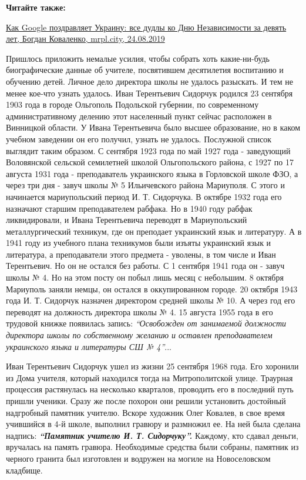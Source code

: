 \textbf{Читайте также:} 

\href{https://mrpl.city/news/view/kak-google-pozdravlyaet-ukrainu-vse-dudly-ko-dnyu-nezavisimosti-za-devyat-let-foto}{%
Как Google поздравляет Украину: все дудлы ко Дню Независимости за девять лет, Богдан Коваленко, mrpl.city, 24.08.2019}

Пришлось приложить немалые усилия, чтобы собрать хоть какие-ни\hyp{}будь
биографические данные об учителе, посвятившем десятилетия воспитанию и обучению
детей. Личное дело директора школы не удалось разыскать. И тем не менее кое-что
узнать удалось. Иван Терентьевич Сидорчук родился 23 сентября 1903 года в
городе Ольгополь Подольской губернии, по современному административному делению
этот населенный пункт сейчас расположен в Винницкой области. У Ивана
Терентьевича было высшее образование, но в каком учебном заведении он его
получил, узнать не удалось. Послужной список выглядит таким образом. С сентября
1923 года по май 1927 года - заведующий Воловянской сельской семилетней школой
Ольгопольского района, с 1927 по 17 августа 1931 года - преподаватель
украинского языка в Горловской школе ФЗО, а через три дня - завуч школы № 5
Ильичевского района Мариуполя. С этого и начинается мариупольский период И. Т.
Сидорчука. В октябре 1932 года его назначают старшим преподавателем рабфака. Но
в 1940 году рабфак ликвидировали, и Ивана Терентьевича переводят в
Мариупольский металлургический техникум, где он преподает украинский язык и
литературу. А в 1941 году из учебного плана техникумов были изъяты украинский
язык и литература, а преподаватели этого предмета - уволены, в том числе и Иван
Терентьевич. Но он не остался без работы. С 1 сентября 1941 года он - завуч
школы № 4. Но на этом посту он побыл лишь месяц с небольшим. 8 октября
Мариуполь заняли немцы, он остался в оккупированном городе. 20 октября 1943
года И. Т. Сидорчук назначен директором средней школы № 10. А через год его
переводят на должность директора школы № 4. 15 августа 1955 года в его трудовой
книжке появилась запись: \emph{\enquote{Освобожден от занимаемой должности директора школы по
собственному желанию и оставлен преподавателем украинского языка и литературы
СШ № 4}}...

Иван Терентьевич Сидорчук ушел из жизни 25 сентября 1968 года. Его хоронили из
Дома учителя, который находился тогда на Митрополитской улице. Траурная
процессия растянулась на несколько кварталов, проводить его в последний путь
пришли ученики. Сразу же после похорон они решили установить достойный
надгробный памятник учителю. Вскоре художник Олег Ковалев, в свое время
учившийся в 4-й школе, выполнил гравюру и размножил ее. На ней была сделана
надпись: \emph{\bfseries\enquote{Памятник учителю И. Т. Сидорчуку}.} Каждому, кто сдавал деньги,
вручалась на память гравюра. Необходимые средства были собраны, памятник из
черного гранита был изготовлен и водружен на могиле на Новоселовском кладбище.
